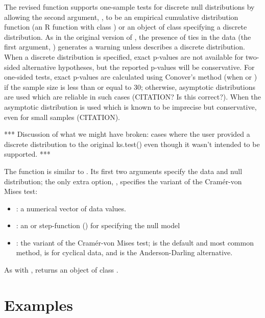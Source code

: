 The revised  function supports one-sample tests for discrete
null distributions by allowing the second argument, , to be
an empirical cumulative distribution function (an R function
with class ) or an object of class  specifying
a discrete distribution.  As in the original version of ,
the presence of ties in the data (the first argument, ) generates a
warning unless  describes a discrete distribution.  When a discrete
distribution is specified, exact p-values are not available for 
two-sided alternative hypotheses, but the reported p-values will be
conservative.  For one-sided tests,
exact p-values are calculated using Conover's
method (when  or )
if the sample size is less than or equal to 30; otherwise, asymptotic distributions
are used which are reliable in such cases (CITATION? Is this correct?).
When  the asymptotic distribution is used which is known
to be imprecise but conservative, even for small samples (CITATION).

*** Discussion of what we might have broken: cases where the user
provided a discrete distribution to the original ks.test() even though
it wasn't intended to be supported. ***

The function  is similar to .  Its first two
arguments specify the data and null distribution; the only extra option,
, specifies the variant of the Cram\'{e}r-von Mises test:
\begin{itemize}
\item {}: a numerical vector of data values.
\item {}: an  or step-function () for specifying
the null model
\item {}: the variant of the Cram\'{e}r-von Mises test; 
is the default and most common method,  is for cyclical data,
and  is the Anderson-Darling alternative.
\end{itemize}
As with ,  returns an object of class 
.

 
\section{Examples}

